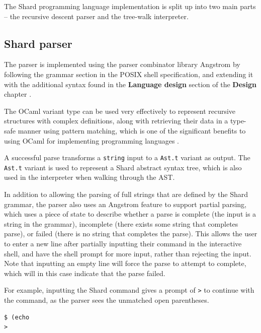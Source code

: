 \documentclass[twoside]{report}
\begin{document}
The Shard programming language implementation is split up into two main parts -- the recursive descent parser and the tree-walk interpreter.

\subsection{Shard parser}

The parser is implemented using the parser combinator library Angstrom by following the grammar section in the POSIX shell specification, and extending it with the additional syntax found in the \textbf{Language design} section of the \textbf{Design} chapter \cite{ocamlangstrom} \cite{posix2017}.

The OCaml variant type can be used very effectively to represent recursive structures with complex definitions, along with retrieving their data in a type-safe manner using pattern matching, which is one of the significant benefits to using OCaml for implementing programming languages \cite{realworldocaml}.

A successful parse transforms a \texttt{string} input to a \texttt{Ast.t} variant as output. The \texttt{Ast.t} variant is used to represent a Shard abstract syntax tree, which is also used in the interpreter when walking through the AST.

In addition to allowing the parsing of full strings that are defined by the Shard grammar, the parser also uses an Angstrom feature to support partial parsing, which uses a piece of state to describe whether a parse is complete (the input is a string in the grammar), incomplete (there exists some string that completes parse), or failed (there is no string that completes the parse).
This allows the user to enter a new line after partially inputting their command in the interactive shell, and have the shell prompt for more input, rather than rejecting the input.
Note that inputting an empty line will force the parse to attempt to complete, which will in this case indicate that the parse failed.

For example, inputting the Shard command gives a prompt of \texttt{>} to continue with the command, as the parser sees the unmatched open parentheses.

\begin{minipage}[c]{\textwidth-15pt}
  \begin{lstlisting}[language=shard]
$ (echo
>
\end{lstlisting}
  \smallskip
\end{minipage}
\end{document}
